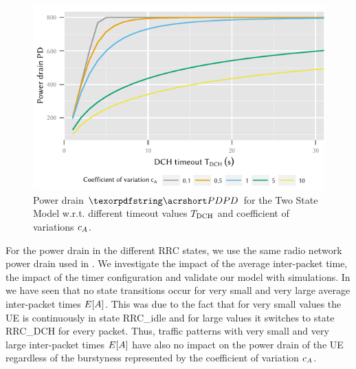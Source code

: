 \begin{figure}
	\centering
	\includegraphics{network/performance_model/numerical_examples/figures/2state_tdch_pd}
	\caption{Power drain \(\headershortacr{PD}\) for the Two State Model w.r.t. different timeout values \(T_{\text{DCH}}\) and coefficient of variations \(c_{A}\).}
	\label{fig:network:performance_model:numerical_examples:validations:analytic_vs_simulation:2state_tdch_pd}
\end{figure}

For the power drain in the different \gls{RRC} states, we use the same radio network power drain  used in .
We investigate the impact of the average inter-packet time, the impact of the timer configuration and validate our model with simulations.
In  we have seen that no state transitions occur for very small and very large average inter-packet times \(E[A]\).
This was due to the fact that for very small values the \gls{UE} is continuously in state \gls{RRC_idle} and for large values it switches to state \gls{RRC_DCH} for every packet.
Thus, traffic patterns with very small and very large inter-packet times \(E[A]\) have also no impact on the power drain of the \gls{UE} regardless of the burstyness represented by the coefficient of variation \(c_{A}\).

